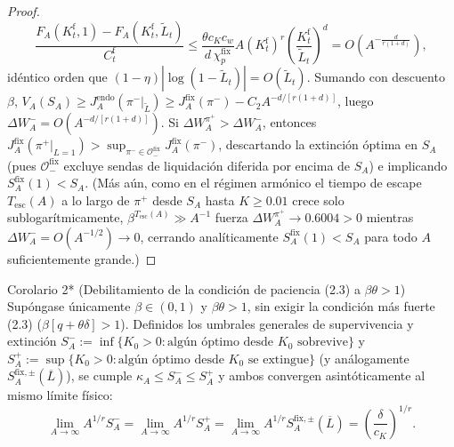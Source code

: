 \documentclass[11pt,letterpaper]{article}
\theoremstyle{plain}
\newtheorem*{namedthm}{\protect\namedthmname}
\newcommand{\namedthmname}{}
\newenvironment{thm_box}[1]{\renewcommand{\namedthmname}{#1}\begin{namedthm}}{\end{namedthm}}
\begin{document}
\begin{proof}
\[
\frac{F_A(K_t^{\mathrm{f}},1) - F_A(K_t^{\mathrm{f}},\tilde{L}_t)}{C_t^{\mathrm{f}}} \le \frac{\theta c_K c_w}{d\,\chi_p^{\mathrm{fix}}} A(K_t^{\mathrm{f}})^r \left(\frac{K_t^{\mathrm{f}}}{\tilde{L}_t}\right)^d = O\!\left(A^{-\frac{d}{r(1+d)}}\right),
\]
idéntico orden que $(1-\eta)|\log(1-\tilde{L}_t)|=O(\tilde{L}_t)$. Sumando con descuento $\beta$, $V_A(S_A)\ge J_A^{\mathrm{endo}}(\pi^-|_{\tilde{L}})\ge J_A^{\mathrm{fix}}(\pi^-)-C_2 A^{-d/[r(1+d)]}$, luego $\Delta W_A^-=O(A^{-d/[r(1+d)]})$. Si $\Delta W_A^{\pi^+} > \Delta W_A^-$, entonces $J_A^{\mathrm{fix}}(\pi^+|_{L=1}) > \sup_{\pi^-\in\mathcal{O}_-^{\mathrm{fix}}} J_A^{\mathrm{fix}}(\pi^-)$, descartando la extinción óptima en $S_A$ (pues $\mathcal{O}_-^{\mathrm{fix}}$ excluye sendas de liquidación diferida por encima de $S_A$) e implicando $S_A^{\mathrm{fix}}(1)<S_A$. (Más aún, como en el régimen armónico el tiempo de escape $T_{\mathrm{esc}}(A)$ a lo largo de $\pi^+$ desde $S_A$ hasta $K\ge 0.01$ crece solo sublogarítmicamente, $\beta^{T_{\mathrm{esc}}(A)}\gg A^{-1}$ fuerza $\Delta W_A^{\pi^+}\to 0.6004 > 0$ mientras $\Delta W_A^- = O(A^{-1/2})\to 0$, cerrando analíticamente $S_A^{\mathrm{fix}}(1)<S_A$ para todo $A$ suficientemente grande.)
\end{proof}

\begin{thm_box}{Corolario 2* (Debilitamiento de la condición de paciencia (2.3) a $\beta\theta > 1$)}
Supóngase únicamente $\beta\in(0,1)$ y \textbf{$\beta\theta > 1$}, sin exigir la condición más fuerte (2.3) ($\beta[q+\theta\delta]>1$). Definidos los umbrales generales de supervivencia y extinción $S_A^- := \inf\{K_0>0 : \text{algún óptimo desde } K_0 \text{ sobrevive}\}$ y $S_A^+ := \sup\{K_0>0 : \text{algún óptimo desde } K_0 \text{ se extingue}\}$ (y análogamente $S_A^{\mathrm{fix},\pm}(\overline{L})$), se cumple $\kappa_A \le S_A^- \le S_A^+$ y ambos convergen asintóticamente al mismo límite físico:
\[
\lim_{A\to\infty} A^{1/r} S_A^- = \lim_{A\to\infty} A^{1/r} S_A^+ = \lim_{A\to\infty} A^{1/r} S_A^{\mathrm{fix},\pm}(\overline{L}) = \left(\frac{\delta}{c_K}\right)^{1/r}.
\]
\end{thm_box}
\end{document}
